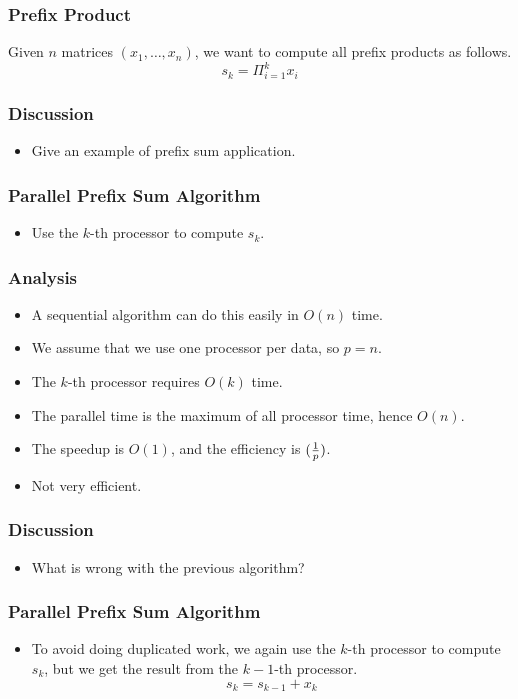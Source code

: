 \documentclass{beamer}
\begin{document}
\begin{CJK}{UTF8}{bsmi}
\begin{frame}
\frametitle{Prefix Product} Given $n$ matrices $(x_1, \ldots, x_n)$, we
want to compute all prefix products as follows.
\begin{equation}
s_k = \Pi_{i = 1}^k x_i
\end{equation}
\end{frame}

\begin{frame}
\frametitle{Discussion}
\begin{itemize}
\item Give an example of prefix sum application.
\end{itemize}
\end{frame}

\begin{frame}
\frametitle{Parallel Prefix Sum Algorithm}
\begin{itemize}
\item Use the $k$-th processor to compute $s_k$.
\end{itemize}
\end{frame}


\begin{frame}
\frametitle{Analysis}
\begin{itemize}
\item A sequential algorithm can do this easily in $O(n)$ time.
\item We assume that we use one processor per data, so $p = n$.
\item The $k$-th processor requires $O(k)$ time.
\item The parallel time is the maximum of all processor time, hence $O(n)$.
\item The speedup is $O(1)$, and the efficiency is $({1 \over p})$. 
\item Not very efficient.
\end{itemize}
\end{frame}

\begin{frame}
\frametitle{Discussion}
\begin{itemize}
\item What is wrong with the previous algorithm?
\end{itemize}
\end{frame}

\begin{frame}
\frametitle{Parallel Prefix Sum Algorithm}
\begin{itemize}
\item To avoid doing duplicated work, we again use the $k$-th processor to compute $s_k$, but we get the result from the $k-1$-th processor.
\begin{equation}
s_k = s_{k-1} + x_k
\end{equation}
\end{itemize}
\end{frame}


\end{CJK}
\end{document}
